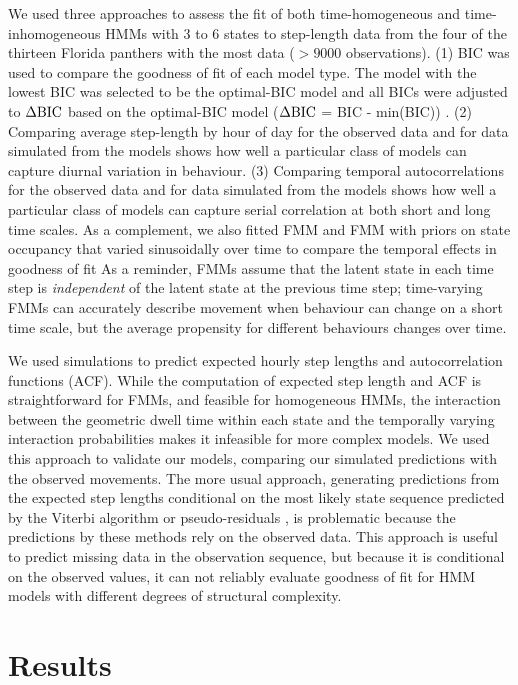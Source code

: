 \documentclass{bmcart}
\newcommand{\dbic}{\ensuremath \Delta \textrm{BIC}}
\begin{document}
We used three approaches to assess the fit of both time-homogeneous and time-inhomogeneous 
HMMs with 3 to 6 states to step-length data from the four of the thirteen Florida panthers 
with the most data ($> 9000 $ observations). (1) BIC was used to compare the goodness of fit of 
each model type. The model with the lowest BIC was selected to be the optimal-BIC model and all 
BICs were adjusted to $\dbic$ based on the optimal-BIC model ($\dbic$ = BIC - min(BIC)) . (2) 
Comparing average step-length by hour of day for the 
observed data and for data simulated from the models shows how well a particular class of 
models can capture diurnal variation in behaviour. (3) Comparing temporal autocorrelations
for the observed data and for data simulated from the models shows how well a particular class
of models can capture serial correlation at both short and long time scales. As a complement, we 
also fitted FMM and FMM with priors on state occupancy that varied sinusoidally over time to 
compare the temporal effects in goodness of fit As a reminder, FMMs assume that the latent state 
in each time step is \emph{independent} of the latent state at the previous time step; 
time-varying FMMs can accurately describe movement when behaviour can
change on a short time scale, but the average propensity for different
behaviours changes over time.

We used simulations to predict expected hourly step lengths and
autocorrelation functions (ACF).  While the computation of expected
step length and ACF is straightforward for FMMs, and feasible for
homogeneous HMMs, the interaction between the geometric dwell time
within each state and the temporally varying interaction probabilities
makes it infeasible for more complex models.  We used this approach to
validate our models, comparing our simulated predictions with the
observed movements.  The more usual approach, generating predictions
from the expected step lengths conditional on the most likely state
sequence predicted by the Viterbi algorithm or pseudo-residuals \cite{zucchini_hidden_2009,langrock_flexible_2012}, is problematic
because the predictions by these methods rely on the observed data. 
This approach is useful to predict
missing data in the observation sequence, but because it is
conditional on the observed values, it can not reliably evaluate
goodness of fit for HMM models with
different degrees of structural complexity.

\section*{Results}
      
\end{document}
